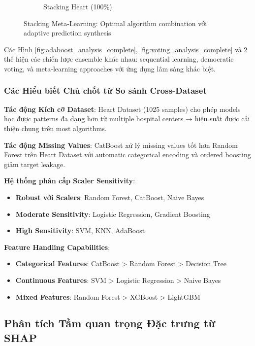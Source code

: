 \begin{figure}[H]
\begin{subfigure}[b]{0.48\textwidth}
\caption{Stacking Heart (100\%)}
\label{fig:stacking_heart_performance}
\end{subfigure}
\caption{Stacking Meta-Learning: Optimal algorithm combination với adaptive prediction synthesis}
\label{fig:stacking_analysis_complete}
\end{figure}

Các Hình \ref{fig:adaboost_analysis_complete}, \ref{fig:voting_analysis_complete} và \ref{fig:stacking_analysis_complete} thể hiện các chiến lược ensemble khác nhau: sequential learning, democratic voting, và meta-learning approaches với ứng dụng lâm sàng khác biệt.

\subsubsection{Các Hiểu biết Chủ chốt từ So sánh Cross-Dataset}

\textbf{Tác động Kích cỡ Dataset}: Heart Dataset (1025 samples) cho phép models học được patterns đa dạng hơn từ multiple hospital centers → hiệu suất được cải thiện chung trên most algorithms.

\textbf{Tác động Missing Values}: CatBoost xử lý missing values tốt hơn Random Forest trên Heart Dataset với automatic categorical encoding và ordered boosting giảm target leakage.

\textbf{Hệ thống phân cấp Scaler Sensitivity}:
\begin{itemize}
    \item \textbf{Robust với Scalers}: Random Forest, CatBoost, Naive Bayes
    \item \textbf{Moderate Sensitivity}: Logistic Regression, Gradient Boosting  
    \item \textbf{High Sensitivity}: SVM, KNN, AdaBoost
\end{itemize}

\textbf{Feature Handling Capabilities}:
\begin{itemize}
    \item \textbf{Categorical Features}: CatBoost > Random Forest > Decision Tree
    \item \textbf{Continuous Features}: SVM > Logistic Regression > Naive Bayes
    \item \textbf{Mixed Features}: Random Forest > XGBoost > LightGBM
\end{itemize}

\subsection{Phân tích Tầm quan trọng Đặc trưng từ SHAP}\label{subsec:ra-feature-importance-analysis}

